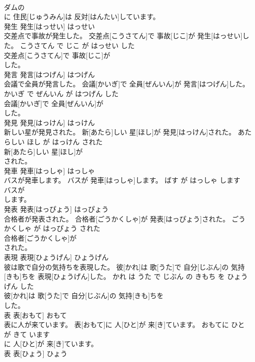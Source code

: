 \documentclass[8pt]{extreport}
\begin{document}
\begin{CJK}{UTF8}{min}
\\	ダムの
\\	に 住民[じゅうみん]は 反対[はんたい]しています。			
\\	発生	発生[はっせい]	はっせい	
\\	交差点で事故が発生した。	交差点[こうさてん]で 事故[じこ]が 発生[はっせい]した。	こうさてん で じこ が はっせい した	
\\	交差点[こうさてん]で 事故[じこ]が
\\	した。			
\\	発言	発言[はつげん]	はつげん	
\\	会議で全員が発言した。	会議[かいぎ]で 全員[ぜんいん]が 発言[はつげん]した。	かいぎ で ぜんいん が はつげん した	
\\	会議[かいぎ]で 全員[ぜんいん]が
\\	した。			
\\	発見	発見[はっけん]	はっけん	
\\	新しい星が発見された。	新[あたら]しい 星[ほし]が 発見[はっけん]された。	あたらしい ほし が はっけん された	
\\	新[あたら]しい 星[ほし]が
\\	された。			
\\	発車	発車[はっしゃ]	はっしゃ	
\\	バスが発車します。	バスが 発車[はっしゃ]します。	ばす が はっしゃ します	
\\	バスが
\\	します。			
\\	発表	発表[はっぴょう]	はっぴょう	
\\	合格者が発表された。	合格者[ごうかくしゃ]が 発表[はっぴょう]された。	ごうかくしゃ が はっぴょう された	
\\	合格者[ごうかくしゃ]が
\\	された。			
\\	表現	表現[ひょうげん]	ひょうげん	
\\	彼は歌で自分の気持ちを表現した。	彼[かれ]は 歌[うた]で 自分[じぶん]の 気持[きも]ちを 表現[ひょうげん]した。	かれ は うた で じぶん の きもち を ひょうげん した	
\\	彼[かれ]は 歌[うた]で 自分[じぶん]の 気持[きも]ちを
\\	した。			
\\	表	表[おもて]	おもて	
\\	表に人が来ています。	表[おもて]に 人[ひと]が 来[き]ています。	おもてに ひと が きて います	
\\	に 人[ひと]が 来[き]ています。			
\\	表	表[ひょう]	ひょう	

\end{CJK}
\end{document}
